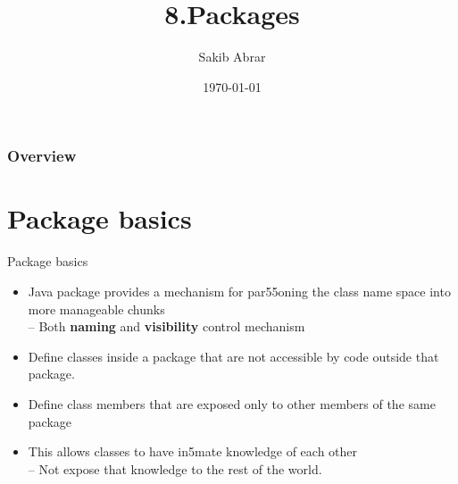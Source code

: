 \documentclass{beamer}
\title[Packages]{8.Packages} %
\author{Sakib Abrar} %
\institute[BUET] %
{
CSE\\~\\Bangladesh University of Engineering \& Technology \\ %
\medskip
\textit{sakib.cghs@gmail.com} %
}
\date{\today} %
\begin{document}
\begin{frame}
\titlepage %
\end{frame}

\begin{frame}
\frametitle{Overview} %
\tableofcontents %
\end{frame}


\section{Package basics}


\begin{frame}{Package basics}
\begin{itemize}
\item Java package provides a mechanism for par55oning
the class name space into more manageable chunks\\
– Both \textbf{naming} and \textbf{visibility} control mechanism
\item Define classes inside a package that are not
accessible by code outside that package.\\
\item Define class members that are exposed only to other
members of the same package\\
\item This allows classes to have in5mate knowledge of
each other\\
– Not expose that knowledge to the rest of the world.\\
\end{itemize}
\end{frame}
\end{document}
